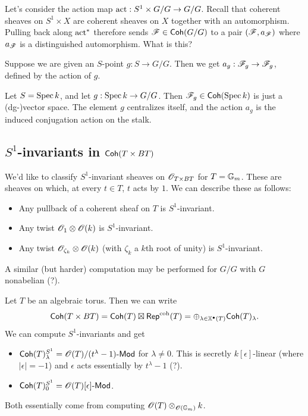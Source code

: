 \documentclass{article}
\begin{document}
Let's consider the action map $\operatorname{act}: S^1 \times G / G \to G / G$.
Recall that coherent sheaves on $S^1 \times X$ are coherent sheaves on $X$ together with an automorphism.
Pulling back along $\operatorname{act}^*$ therefore sends $\mathscr{F} \in \mathsf{Coh}(G / G)$ to a pair $(\mathscr{F}, a_{\mathscr{F}})$ where $a_{\mathscr{F}}$ is a distinguished automorphism.
What is this?

Suppose we are given an $S$-point $g: S \to G / G$.
Then we get $a_g: \mathscr{F}_g \to \mathscr{F}_g$, defined by the action of $g$.

\begin{ex}
  Let $S = \operatorname{Spec} k$, and let $g: \operatorname{Spec} k \to G / G$.
  Then $\mathscr{F}_g \in \mathsf{Coh}(\operatorname{Spec} k)$ is just a (dg-)vector space.
  The element $g$ centralizes itself, and the action $a_g$ is the induced conjugation action on the stalk.
\end{ex}

\subsection{$S^1$-invariants in $\mathsf{Coh}(T \times BT)$}

\begin{ex}
  We'd like to classify $S^1$-invariant sheaves on $\mathscr{O}_{T \times BT}$ for $T = \mathbb{G}_m$.
  These are sheaves on which, at every $t \in T$, $t$ acts by $1$.
  We can describe these as follows:
  \begin{itemize}
    \item Any pullback of a coherent sheaf on $T$ is $S^1$-invariant.
    \item Any twist $\mathscr{O}_1 \otimes \mathscr{O}(k)$ is $S^1$-invariant.
    \item Any twist $\mathscr{O}_{\zeta_k} \otimes \mathscr{O}(k)$ (with $\zeta_k$ a $k$th root of unity) is $S^1$-invariant.
  \end{itemize}
\end{ex}

A similar (but harder) computation may be performed for $G / G$ with $G$ nonabelian (?).

\begin{ex}
  Let $T$ be an algebraic torus.
  Then we can write
  \[
    \mathsf{Coh}(T \times BT) = \mathsf{Coh}(T) \boxtimes \mathsf{Rep}^{\mathrm{coh}}(T) = \oplus_{\lambda \in \operatorname{\mathbb{X}^{\bullet}}(T)} \mathsf{Coh}(T)_\lambda.
  \]
  We can compute $S^1$-invariants and get
  \begin{itemize}
    \item $\mathsf{Coh}(T)_\lambda^{S^1} = \mathscr{O}(T) / (t^\lambda - 1)\text{-}\mathsf{Mod}$ for $\lambda \neq 0$.
      This is secretly $k[\epsilon]$-linear (where $|\epsilon| = -1$) and $\epsilon$ acts essentially by $t^\lambda - 1$ (?).
    \item $\mathsf{Coh}(T)_0^{S^1} = \mathscr{O}(T)[\epsilon]\text{-}\mathsf{Mod}$.
  \end{itemize}
  Both essentially come from computing $\mathscr{O}(T) \otimes_{\mathscr{O}(\mathbb{G}_m)} k$.
\end{ex}
\end{document}

